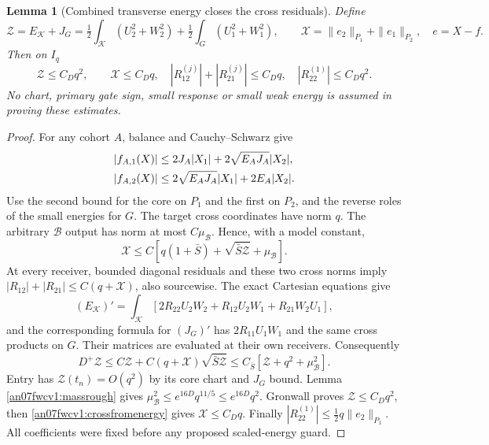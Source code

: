\documentclass[11pt]{article}
\numberwithin{equation}{section}
\newtheorem{lemma}[theorem]{Lemma}
\newcommand{\KK}{\mathcal K}\newcommand{\BB}{\mathcal B}
\begin{document}
\begin{lemma}[Combined transverse energy closes the cross residuals]
\label{an07fwcv1:transverse}
Define
\[
 \mathcal Z=E_\KK+J_G
 =\tfrac12\int_\KK(U_2^2+W_2^2)
  +\tfrac12\int_G(U_1^2+W_1^2),\qquad
 \mathcal X=\|e_2\|_{P_1}+\|e_1\|_{P_2},\quad e=X-f.
\]
Then on \(I_q\)
\begin{equation}
 \mathcal Z\le C_Dq^2,\qquad
 \mathcal X\le C_Dq,
 \quad |R_{12}^{(j)}|+|R_{21}^{(j)}|\le C_Dq,
 \quad |R_{22}^{(1)}|\le C_Dq^2.
 \label{an07fwcv1:primitive}
\end{equation}
No chart, primary gate sign, small response or small weak energy
is assumed in proving these estimates.
\end{lemma}
\begin{proof}
For any cohort \(A\), balance and Cauchy--Schwarz give
\begin{align}
 |f_{A,1}(X)|&\le2J_A|X_1|+2\sqrt{E_AJ_A}|X_2|,\notag\\
 |f_{A,2}(X)|&\le2\sqrt{E_AJ_A}|X_1|+2E_A|X_2|.
 \label{an07fwcv1:outputenergy}
\end{align}
Use the second bound for the core on \(P_1\) and the first
on \(P_2\), and the reverse roles of the small energies for
\(G\). The target cross coordinates have norm \(q\).
The arbitrary \(\BB\) output has norm at most \(C\mu_\BB\).
Hence, with a model constant,
\begin{equation}
 \mathcal X\le C[q(1+\bar S)+\sqrt{\bar S\mathcal Z}+\mu_\BB].
 \label{an07fwcv1:crossfromenergy}
\end{equation}
At every receiver, bounded diagonal residuals and these two
cross norms imply \(|R_{12}|+|R_{21}|\le C(q+\mathcal X)\),
also sourcewise. The exact Cartesian equations give
\[
 (E_\KK)'=\int_\KK
 [2R_{22}U_2W_2+R_{12}U_2W_1+R_{21}W_2U_1],
\]
and the corresponding formula for \((J_G)'\) has
\(2R_{11}U_1W_1\) and the same cross products on \(G\).
Their matrices are evaluated at their own receivers.
Consequently
\[
 D^+\mathcal Z\le C\mathcal Z
     +C(q+\mathcal X)\sqrt{\bar S\mathcal Z}
 \le C_{\bar S}[\mathcal Z+q^2+\mu_\BB^2].
\]
Entry has \(\mathcal Z(t_n)=O(q^2)\) by its core chart
and \(J_G\) bound. Lemma \ref{an07fwcv1:massrough} gives
\(\mu_\BB^2\le e^{16D}q^{11/5}\le e^{16D}q^2\).
Gronwall proves \(\mathcal Z\le C_Dq^2\), then
\eqref{an07fwcv1:crossfromenergy} gives \(\mathcal X\le C_Dq\).
Finally \(|R_{22}^{(1)}|\le\frac12q\|e_2\|_{P_1}\).
All coefficients were fixed before any proposed scaled-energy guard.
\end{proof}
\end{document}
